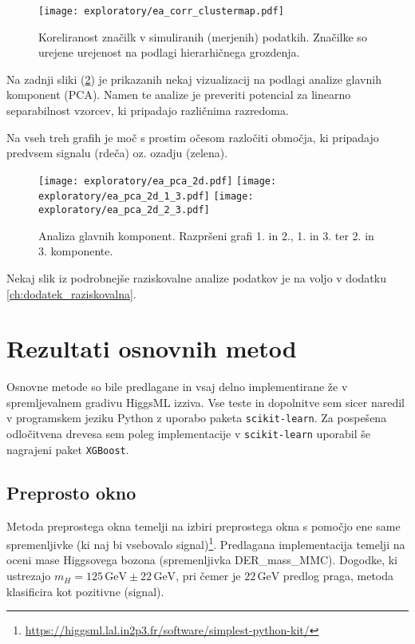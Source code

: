 \documentclass[11pt,a4paper,openany]{book}
\begin{document}
\begin{figure}[ht]
	\centering
	\texttt{[image: exploratory/ea\_corr\_clustermap.pdf]}
	\caption{Koreliranost značilk v simuliranih (merjenih) podatkih. Značilke so urejene urejenost na podlagi hierarhičnega grozdenja.}
	\label{sl:corr_clust_matrix}
\end{figure}

Na zadnji sliki (\ref{sl:pca}) je prikazanih nekaj vizualizacij na podlagi analize glavnih komponent (PCA). Namen te analize je preveriti potencial za linearno separabilnost vzorcev, ki pripadajo različnima razredoma. 


Na vseh treh grafih je moč s prostim očesom razločiti območja, ki pripadajo predvsem signalu (rdeča) oz. ozadju (zelena).

\begin{figure}[h]	
	\texttt{[image: exploratory/ea\_pca\_2d.pdf]}
	\texttt{[image: exploratory/ea\_pca\_2d\_1\_3.pdf]}
	\texttt{[image: exploratory/ea\_pca\_2d\_2\_3.pdf]}		
	
	\caption{Analiza glavnih komponent. Razpršeni grafi 1. in 2., 1. in 3. ter 2. in 3. komponente.}
	\label{sl:pca}
\end{figure}

Nekaj slik iz podrobnejše raziskovalne analize podatkov je na voljo v dodatku \ref{ch:dodatek_raziskovalna}.

	
\chapter{Rezultati osnovnih metod}

Osnovne metode so bile predlagane in vsaj delno implementirane že v spremljevalnem gradivu HiggsML izziva. Vse teste in dopolnitve sem sicer naredil v programskem jeziku Python z uporabo paketa \texttt{scikit-learn}\cite{scikit-learn}. Za pospešena odločitvena drevesa sem poleg implementacije v \texttt{scikit-learn} uporabil še nagrajeni paket \texttt{XGBoost}\cite{chen2014}.

	
\section{Preprosto okno}

Metoda preprostega okna temelji na izbiri preprostega okna s pomočjo ene same spremenljivke (ki naj bi vsebovalo signal)\footnote{\url{https://higgsml.lal.in2p3.fr/software/simplest-python-kit/}}. Predlagana implementacija temelji na oceni mase Higgsovega bozona (spremenljivka DER\_mass\_MMC). Dogodke, ki ustrezajo $m_H = 125\,\text{GeV} \pm 22\,\text{GeV}$, pri čemer je $22\,\text{GeV}$ predlog praga, metoda klasificira kot pozitivne (signal).
\end{document}
